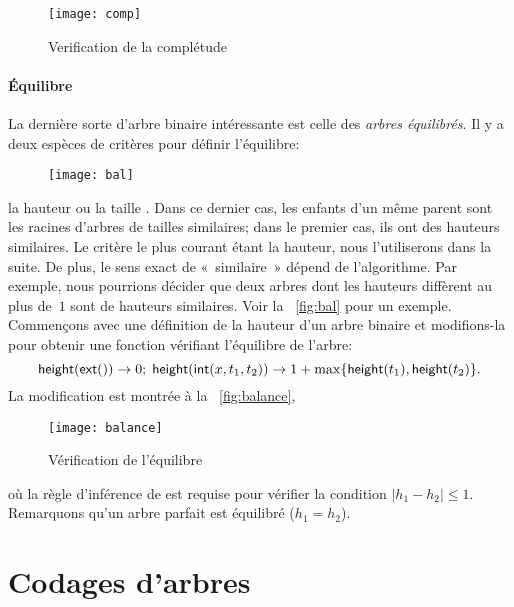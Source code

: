 \bigskip

\begin{figure}[h]
\centering
\texttt{[image: comp]}
\caption{Verification de la complétude}
\label{fig:comp}
\end{figure}

\paragraph{Équilibre}

La dernière sorte d'arbre binaire intéressante est celle des
\emph{arbres équilibrés}. Il y a
deux espèces de critères pour définir l'équilibre:
\begin{wrapfigure}[7]{r}[0pt]{0pt}
\centering
\texttt{[image: bal]}
\caption{}
\label{fig:bal}
\end{wrapfigure}
la hauteur ou la taille
\citep{NievergeltReingold_1972,HiraiYamamoto_2011}. Dans ce dernier
cas, les enfants d'un même parent sont les racines d'arbres de tailles
similaires; dans le premier cas, ils ont des hauteurs similaires. Le
critère le plus courant étant la hauteur, nous l'utiliserons dans la
suite. De plus, le sens exact de «~similaire~» dépend de
l'algorithme. Par exemple, nous pourrions décider que deux arbres dont
les hauteurs diffèrent au plus de~\(1\) sont de hauteurs
similaires. Voir la \fig~\vref{fig:bal} pour un exemple. Commençons
avec une définition de la hauteur d'un arbre binaire et
modifions-la pour obtenir une fonction vérifiant l'équilibre de
l'arbre:
\begin{equation*}
\textsf{height}(\textsf{ext}()) \rightarrow 0;
\;
\textsf{height}(\textsf{int}(x,t_1,t_2)) \rightarrow 1 +
\max\{\textsf{height}(t_1), \textsf{height}(t_2)\}.
\end{equation*}
La modification est montrée à la \fig~\vref{fig:balance},
\begin{figure}
\centering
\texttt{[image: balance]}
\caption{Vérification de l'équilibre}
\label{fig:balance}
\end{figure}
où la règle d'inférence de
 est requise pour
vérifier la condition \(|h_1 - h_2| \leqslant 1\). Remarquons qu'un
arbre parfait est équilibré (\(h_1 = h_2\)).

\section{Codages d'arbres}


